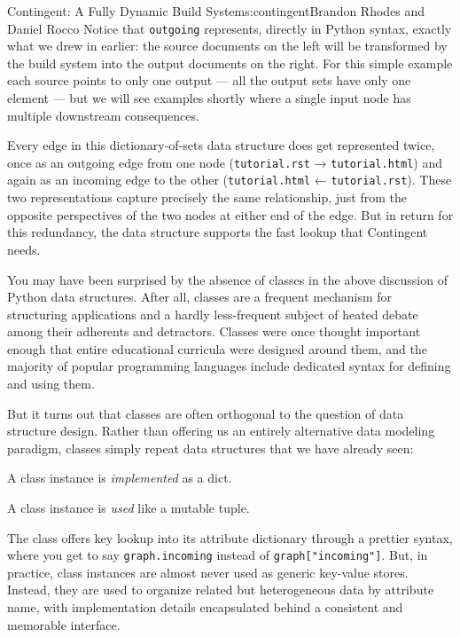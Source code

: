 \begin{aosachapter}{Contingent: A Fully Dynamic Build System}{s:contingent}{Brandon Rhodes and Daniel Rocco}
Notice that \texttt{outgoing} represents, directly in Python syntax,
exactly what we drew in  earlier: the
source documents on the left will be transformed by the build system
into the output documents on the right. For this simple example each
source points to only one output --- all the output sets have only one
element --- but we will see examples shortly where a single input node
has multiple downstream consequences.

Every edge in this dictionary-of-sets data structure does get
represented twice, once as an outgoing edge from one node
(\texttt{tutorial.rst} → \texttt{tutorial.html}) and again as an
incoming edge to the other (\texttt{tutorial.html} ←
\texttt{tutorial.rst}). These two representations capture precisely the
same relationship, just from the opposite perspectives of the two nodes
at either end of the edge. But in return for this redundancy, the data
structure supports the fast lookup that Contingent needs.

\label{the-proper-use-of-classes}

You may have been surprised by the absence of classes in the above
discussion of Python data structures. After all, classes are a frequent
mechanism for structuring applications and a hardly less-frequent
subject of heated debate among their adherents and detractors. Classes
were once thought important enough that entire educational curricula
were designed around them, and the majority of popular programming
languages include dedicated syntax for defining and using them.

But it turns out that classes are often orthogonal to the question of
data structure design. Rather than offering us an entirely alternative
data modeling paradigm, classes simply repeat data structures that we
have already seen:

\begin{aosaitemize}

\item
  A class instance is \emph{implemented} as a dict.
\item
  A class instance is \emph{used} like a mutable tuple.
\end{aosaitemize}

The class offers key lookup into its attribute dictionary through a
prettier syntax, where you get to say \texttt{graph.incoming} instead of
\texttt{graph{[}"incoming"{]}}. But, in practice, class instances are
almost never used as generic key-value stores. Instead, they are used to
organize related but heterogeneous data by attribute name, with
implementation details encapsulated behind a consistent and memorable
interface.


\end{aosachapter}
